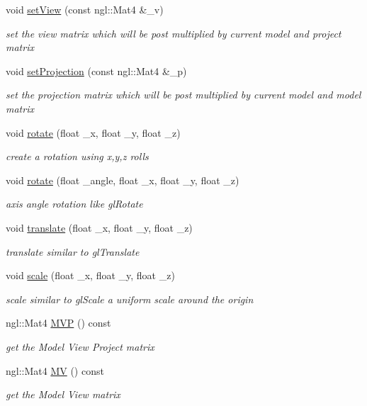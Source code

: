 \begin{DoxyCompactItemize}
void \hyperlink{class_matrix_stack_a2686805de00a5db1749f4299bb01c545}{set\+View} (const ngl\+::\+Mat4 \&\+\_\+v)
\begin{DoxyCompactList}\small\item\em set the view matrix which will be post multiplied by current model and project matrix \end{DoxyCompactList}\item 
void \hyperlink{class_matrix_stack_a14ca718786e859f9b4a800b1d39e8d78}{set\+Projection} (const ngl\+::\+Mat4 \&\+\_\+p)
\begin{DoxyCompactList}\small\item\em set the projection matrix which will be post multiplied by current model and model matrix \end{DoxyCompactList}\item 
void \hyperlink{class_matrix_stack_a34384d88ffcb499b5a76d3b8b964ba77}{rotate} (float \+\_\+x, float \+\_\+y, float \+\_\+z)
\begin{DoxyCompactList}\small\item\em create a rotation using x,y,z rolls \end{DoxyCompactList}\item 
void \hyperlink{class_matrix_stack_acb15ed3386503e6c659c2e74bdee0b77}{rotate} (float \+\_\+angle, float \+\_\+x, float \+\_\+y, float \+\_\+z)
\begin{DoxyCompactList}\small\item\em axis angle rotation like gl\+Rotate \end{DoxyCompactList}\item 
void \hyperlink{class_matrix_stack_a9bf604cc132a1d11608a5cb76cc878d9}{translate} (float \+\_\+x, float \+\_\+y, float \+\_\+z)
\begin{DoxyCompactList}\small\item\em translate similar to gl\+Translate \end{DoxyCompactList}\item 
void \hyperlink{class_matrix_stack_a45d2004459f15ec2c668142843eed887}{scale} (float \+\_\+x, float \+\_\+y, float \+\_\+z)
\begin{DoxyCompactList}\small\item\em scale similar to gl\+Scale a uniform scale around the origin \end{DoxyCompactList}\item 
ngl\+::\+Mat4 \hyperlink{class_matrix_stack_ac42d10e96245541da10045d2e6824fd2}{M\+VP} () const
\begin{DoxyCompactList}\small\item\em get the Model View Project matrix \end{DoxyCompactList}\item 
ngl\+::\+Mat4 \hyperlink{class_matrix_stack_a603053372fd07bef6bf7dfac3fc391c1}{MV} () const
\begin{DoxyCompactList}\small\item\em get the Model View matrix \end{DoxyCompactList}\end{DoxyCompactItemize}



